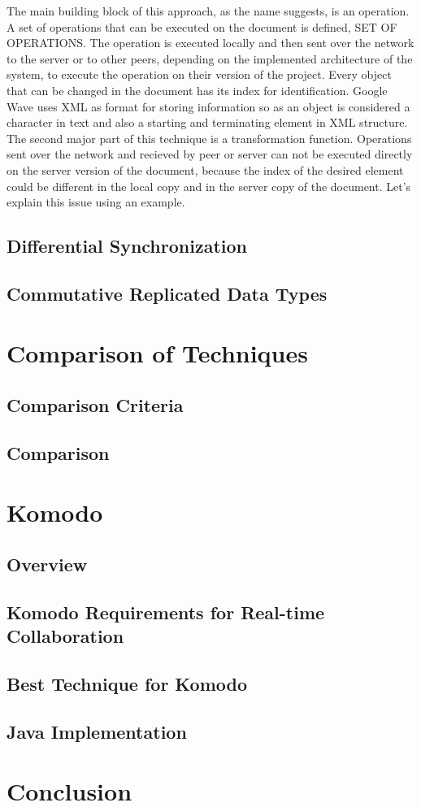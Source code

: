 \documentclass[12pt,oneside,draft]{fithesis2}
\begin{document}
\par The main building block of this approach, as the name suggests, is an operation. A set of operations that can be executed on the document is defined, SET OF OPERATIONS. The operation is executed locally and then sent over the network to the server or to other peers, depending on the implemented architecture of the system, to execute the operation on their version of the project. Every object that can be changed in the document has its index for identification. Google Wave uses XML as format for storing information so as an object is considered a character in text and also a starting and terminating element in XML structure. The second major part of this technique is a transformation function. Operations sent over the network and recieved by peer or server can not be executed directly on the server version of the document, because the index of the desired element could be different in the local copy and in the server copy of the document. Let's explain this issue using an example.
\section{Differential Synchronization}
\section{Commutative Replicated Data Types}
\chapter{Comparison of Techniques}
\section{Comparison Criteria}
\section{Comparison}
\chapter{Komodo}
\section{Overview}
\section{Komodo Requirements for Real-time Collaboration}
\section{Best Technique for Komodo}
\section{Java Implementation}
\chapter{Conclusion}
 
 
\end{document}
